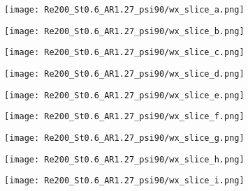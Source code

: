 \begin{figure}[H]
  \centering
  \begin{subfigure}[t]{0.24\textwidth}
    \centering
    \texttt{[image: Re200\_St0.6\_AR1.27\_psi90/wx\_slice\_a.png]}
    \caption{}
    \label{fig:baseline_wx_slices:a}
  \end{subfigure}
  \begin{subfigure}[t]{0.24\textwidth}
    \centering
    \texttt{[image: Re200\_St0.6\_AR1.27\_psi90/wx\_slice\_b.png]}
    \caption{}
    \label{fig:baseline_wx_slices:b}
  \end{subfigure}
  \begin{subfigure}[t]{0.24\textwidth}
    \centering
    \texttt{[image: Re200\_St0.6\_AR1.27\_psi90/wx\_slice\_c.png]}
    \caption{}
    \label{fig:baseline_wx_slices:c}
  \end{subfigure}
  \begin{subfigure}[t]{0.24\textwidth}
    \centering
    \texttt{[image: Re200\_St0.6\_AR1.27\_psi90/wx\_slice\_d.png]}
    \caption{}
    \label{fig:baseline_wx_slices:d}
  \end{subfigure}
  \vspace{0.5cm}
  \begin{subfigure}[t]{0.24\textwidth}
    \centering
    \texttt{[image: Re200\_St0.6\_AR1.27\_psi90/wx\_slice\_e.png]}
    \caption{}
    \label{fig:baseline_wx_slices:e}
  \end{subfigure}
  \begin{subfigure}[t]{0.24\textwidth}
    \centering
    \texttt{[image: Re200\_St0.6\_AR1.27\_psi90/wx\_slice\_f.png]}
    \caption{}
    \label{fig:baseline_wx_slices:f}
  \end{subfigure}
  \begin{subfigure}[t]{0.24\textwidth}
    \centering
    \texttt{[image: Re200\_St0.6\_AR1.27\_psi90/wx\_slice\_g.png]}
    \caption{}
    \label{fig:baseline_wx_slices:g}
  \end{subfigure}
  \begin{subfigure}[t]{0.24\textwidth}
    \centering
    \texttt{[image: Re200\_St0.6\_AR1.27\_psi90/wx\_slice\_h.png]}
    \caption{}
    \label{fig:baseline_wx_slices:h}
  \end{subfigure}
  \vspace{0.5cm}
  \begin{subfigure}[t]{0.24\textwidth}
    \centering
    \texttt{[image: Re200\_St0.6\_AR1.27\_psi90/wx\_slice\_i.png]}

\end{subfigure}
\end{figure}
